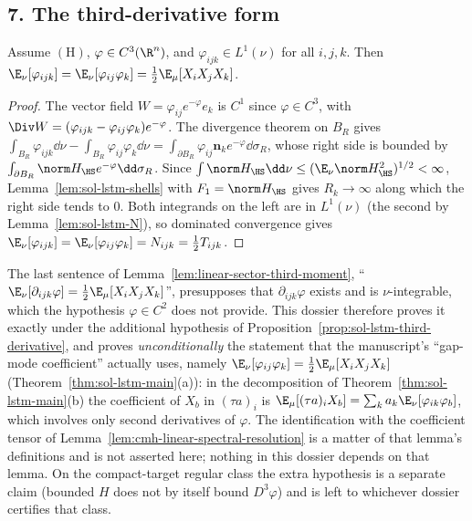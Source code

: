 \documentclass[../main.tex]{subfiles}
\begin{document}
\subsection*{7. The third-derivative form}

\begin{proposition}
\label{prop:sol-lstm-third-derivative}
Assume $(\mathrm H)$, $\varphi\in C^3(\R^n)$, and $\varphi_{ijk}\in L^1(\nu)$ for all $i,j,k$.
Then $\E_\nu[\varphi_{ijk}]=\E_\nu[\varphi_{ij}\varphi_k]=\tfrac12\E_\mu[X_iX_jX_k]$.
\end{proposition}

\begin{proof}
The vector field $W=\varphi_{ij}e^{-\varphi}e_k$ is $C^1$ since $\varphi\in C^3$, with
$\Div W=(\varphi_{ijk}-\varphi_{ij}\varphi_k)e^{-\varphi}$.  The divergence theorem on $B_R$
gives $\int_{B_R}\varphi_{ijk}\dd\nu-\int_{B_R}\varphi_{ij}\varphi_k\dd\nu=\int_{\partial B_R}\varphi_{ij}\mathbf n_ke^{-\varphi}\dd\sigma_R$,
whose right side is bounded by $\int_{\partial B_R}\norm H_{\HS}e^{-\varphi}\dd\sigma_R$.
Since $\int\norm H_{\HS}\dd\nu\le(\E_\nu\norm H_{\HS}^2)^{1/2}<\infty$,
Lemma~\ref{lem:sol-lstm-shells} with $F_1=\norm H_{\HS}$ gives $R_k\to\infty$ along which
the right side tends to $0$.  Both integrands on the left are in $L^1(\nu)$ (the second by
Lemma~\ref{lem:sol-lstm-N}), so dominated convergence gives
$\E_\nu[\varphi_{ijk}]=\E_\nu[\varphi_{ij}\varphi_k]=N_{ijk}=\tfrac12T_{ijk}$.
\end{proof}

\begin{remark}
\label{rem:sol-lstm-third-derivative-hypothesis}
The last sentence of Lemma~\ref{lem:linear-sector-third-moment},
``$\E_\nu[\partial_{ijk}\varphi]=\tfrac12\E_\mu[X_iX_jX_k]$'', presupposes that
$\partial_{ijk}\varphi$ exists and is $\nu$-integrable, which the hypothesis
$\varphi\in C^2$ does not provide.  This dossier therefore proves it exactly under the
additional hypothesis of Proposition~\ref{prop:sol-lstm-third-derivative}, and proves
\emph{unconditionally} the statement that the manuscript's ``gap-mode coefficient'' actually
uses, namely $\E_\nu[\varphi_{ij}\varphi_k]=\tfrac12\E_\mu[X_iX_jX_k]$
(Theorem~\ref{thm:sol-lstm-main}(a)): in the decomposition of
Theorem~\ref{thm:sol-lstm-main}(b) the coefficient of $X_b$ in $(\tau a)_i$ is
$\E_\mu[(\tau a)_iX_b]=\sum_ka_k\E_\nu[\varphi_{ik}\varphi_b]$, which involves only second
derivatives of $\varphi$.  The identification with the coefficient tensor of
Lemma~\ref{lem:cmh-linear-spectral-resolution} is a matter of that lemma's definitions and is
not asserted here; nothing in this dossier depends on that lemma.  On the compact-target
regular class the extra hypothesis is a separate claim (bounded $H$ does not by itself bound
$D^3\varphi$) and is left to whichever dossier certifies that class.
\end{remark}
\end{document}
